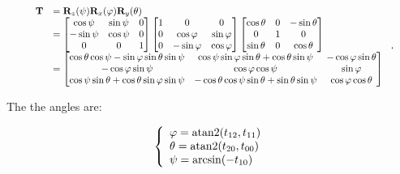    \begin{equation}
        \scalebox{0.85}{
            $ \begin{array}{ll}
                \mathbf{T}
                &= \mathbf{R}_{z}(\psi)\mathbf{R}_{x}(\varphi)\mathbf{R}_{y}(\theta) \\
                &=
                \begin{bmatrix}
                    \cos \psi & \sin \psi & 0 \\
                    -\sin \psi & \cos \psi & 0 \\
                    0 & 0 & 1
                \end{bmatrix}
                \begin{bmatrix}
                    1 & 0 & 0 \\
                    0 & \cos \varphi & \sin \varphi \\
                    0 & -\sin \varphi & \cos \varphi
                \end{bmatrix}
                \begin{bmatrix}
                    \cos \theta & 0 & -\sin \theta \\
                    0 & 1 & 0 \\
                    \sin \theta & 0 & \cos \theta
                \end{bmatrix} \\
                &=
                \begin{bmatrix}
                    \cos \theta \cos \psi - \sin \varphi \sin \theta \sin \psi
                    &  \cos \psi \sin \varphi \sin \theta + \cos \theta \sin \psi
                    & -\cos \varphi \sin \theta \\
                    -\cos \varphi \sin \psi
                    & \cos \varphi \cos \psi
                    & \sin \varphi \\
                    \cos \psi \sin \theta + \cos \theta \sin \varphi \sin \psi
                    & -\cos \theta \cos \psi \sin \theta + \sin \theta \sin \psi
                    & \cos \varphi \cos \theta
                \end{bmatrix}
            \end{array} $
        }
    .\end{equation}

    The the angles are:

    \begin{equation}
        \left\{ \begin{array}{l}
            \varphi = \operatorname{atan2}(t_{12}, t_{11}) \\
            \theta = \operatorname{atan2}(t_{20}, t_{00}) \\
            \psi = \arcsin(-t_{10})
        \end{array} \right.
    \end{equation}

